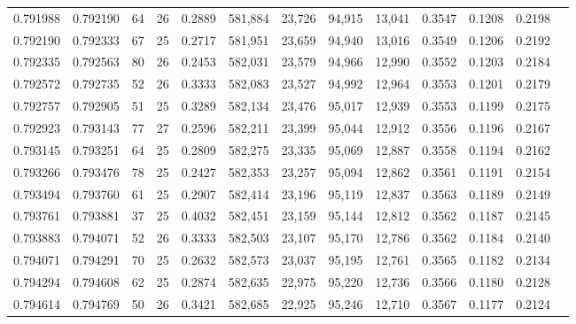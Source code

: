 \begin{tabular}{rrrrrrrrrrrrr}
0.791988 & 0.792190 &    64 &  26 &                                     0.2889 & 581,884 &  23,726 &  94,915 &  13,041 & 0.3547 & 0.1208 & 0.2198 \\
0.792190 & 0.792333 &    67 &  25 &                                     0.2717 & 581,951 &  23,659 &  94,940 &  13,016 & 0.3549 & 0.1206 & 0.2192 \\
0.792335 & 0.792563 &    80 &  26 &                                     0.2453 & 582,031 &  23,579 &  94,966 &  12,990 & 0.3552 & 0.1203 & 0.2184 \\
0.792572 & 0.792735 &    52 &  26 &                                     0.3333 & 582,083 &  23,527 &  94,992 &  12,964 & 0.3553 & 0.1201 & 0.2179 \\
0.792757 & 0.792905 &    51 &  25 &                                     0.3289 & 582,134 &  23,476 &  95,017 &  12,939 & 0.3553 & 0.1199 & 0.2175 \\
0.792923 & 0.793143 &    77 &  27 &                                     0.2596 & 582,211 &  23,399 &  95,044 &  12,912 & 0.3556 & 0.1196 & 0.2167 \\
0.793145 & 0.793251 &    64 &  25 &                                     0.2809 & 582,275 &  23,335 &  95,069 &  12,887 & 0.3558 & 0.1194 & 0.2162 \\
0.793266 & 0.793476 &    78 &  25 &                                     0.2427 & 582,353 &  23,257 &  95,094 &  12,862 & 0.3561 & 0.1191 & 0.2154 \\
0.793494 & 0.793760 &    61 &  25 &                                     0.2907 & 582,414 &  23,196 &  95,119 &  12,837 & 0.3563 & 0.1189 & 0.2149 \\
0.793761 & 0.793881 &    37 &  25 &                                     0.4032 & 582,451 &  23,159 &  95,144 &  12,812 & 0.3562 & 0.1187 & 0.2145 \\
0.793883 & 0.794071 &    52 &  26 &                                     0.3333 & 582,503 &  23,107 &  95,170 &  12,786 & 0.3562 & 0.1184 & 0.2140 \\
0.794071 & 0.794291 &    70 &  25 &                                     0.2632 & 582,573 &  23,037 &  95,195 &  12,761 & 0.3565 & 0.1182 & 0.2134 \\
0.794294 & 0.794608 &    62 &  25 &                                     0.2874 & 582,635 &  22,975 &  95,220 &  12,736 & 0.3566 & 0.1180 & 0.2128 \\
0.794614 & 0.794769 &    50 &  26 &                                     0.3421 & 582,685 &  22,925 &  95,246 &  12,710 & 0.3567 & 0.1177 & 0.2124 \\

\end{tabular}
